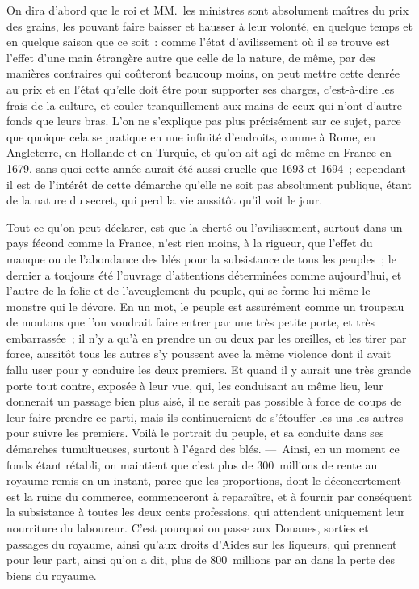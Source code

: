\documentclass[french,twoside]{book} %
\begin{document}
On dira d’abord que le roi et MM. les ministres sont absolument maîtres du prix des grains, les pouvant faire baisser et hausser à leur volonté, en quelque temps et en quelque saison que ce soit : comme l’état d’avilissement où il se trouve est l’effet d’une main étrangère autre que celle de la nature, de même, par des manières contraires qui coûteront beaucoup moins, on peut mettre cette denrée au prix et en l’état qu’elle doit être pour supporter ses charges, c’est-à-dire les frais de la culture, et couler tranquillement aux mains de ceux qui n’ont d’autre fonds que leurs bras. L’on ne s’explique pas plus précisément sur ce sujet, parce que quoique cela se pratique en une infinité d’endroits, comme à Rome, en Angleterre, en Hollande et en Turquie, et qu’on ait agi de même en France en 1679, sans quoi cette année aurait été aussi cruelle que 1693 et 1694 ; cependant il est de l’intérêt de cette démarche qu’elle ne soit pas absolument publique, étant de la nature du secret, qui perd la vie aussitôt qu’il voit le jour.\par
Tout ce qu’on peut déclarer, est que la cherté ou l’avilissement, surtout dans un pays fécond comme la France, n’est rien moins, à la rigueur, que l’effet du manque ou de l’abondance des blés pour la subsistance de tous les peuples ; le dernier a toujours été l’ouvrage d’attentions déterminées comme aujourd’hui, et l’autre de la folie et de l’aveuglement du peuple, qui se forme lui-même le monstre qui le dévore. En un mot, le peuple est assurément comme un troupeau de moutons que l’on voudrait faire entrer par une très petite porte, et très embarrassée ; il n’y a qu’à en prendre un ou deux par les oreilles, et les tirer par force, aussitôt tous les autres s’y poussent avec la même violence dont il avait fallu user pour y conduire les deux premiers. Et quand il y aurait une très grande porte tout contre, exposée à leur vue, qui, les conduisant au même lieu, leur donnerait un passage bien plus aisé, il ne serait pas possible à force de coups de leur faire prendre ce parti, mais ils continueraient de s’étouffer les uns les autres pour suivre les premiers. Voilà le portrait du peuple, et sa conduite dans ses démarches tumultueuses, surtout à l’égard des blés. — Ainsi, en un moment ce fonds étant rétabli, on maintient que c’est plus de 300 millions de rente au royaume remis en un instant, parce que les proportions, dont le déconcertement est la ruine du commerce, commenceront à reparaître, et à fournir par conséquent la subsistance à toutes les deux cents professions, qui attendent uniquement leur nourriture du laboureur. C’est pourquoi on passe aux Douanes, sorties et passages du royaume, ainsi qu’aux droits d’Aides sur les liqueurs, qui prennent pour leur part, ainsi qu’on a dit, plus de 800 millions par an dans la perte des biens du royaume.\par
\end{document}
